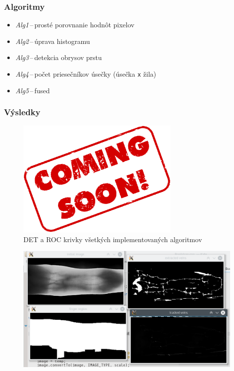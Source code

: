 \documentclass[compress]{beamer}
\begin{document}
\begin{frame}
  \frametitle{Algoritmy}
  \begin{itemize}
    \item \emph{Alg1}\,--\,prosté porovnanie hodnôt pixelov
    \item \emph{Alg2}\,--\,úprava histogramu
    \item \emph{Alg3}\,--\,detekcia obrysov prstu
    \item \emph{Alg4}\,--\,počet priesečníkov úsečky (úsečka \texttt{x} žila)
    \item \emph{Alg5}\,--\,fused
  \end{itemize}
\end{frame}

\begin{frame}
\frametitle{Výsledky}
\begin{figure}[ht!]
	\centering
	\includegraphics[width=8cm]{../fig/all.eps}
	\caption{\label{fig:all} DET a ROC krivky všetkých implementovaných algoritmov}
\end{figure}
\end{frame}

\begin{frame}
\begin{figure}[ht!]
	\centering
	\includegraphics[width=12cm]{../fig/test_orig.eps}
\end{figure}
\end{frame}
\end{document}
